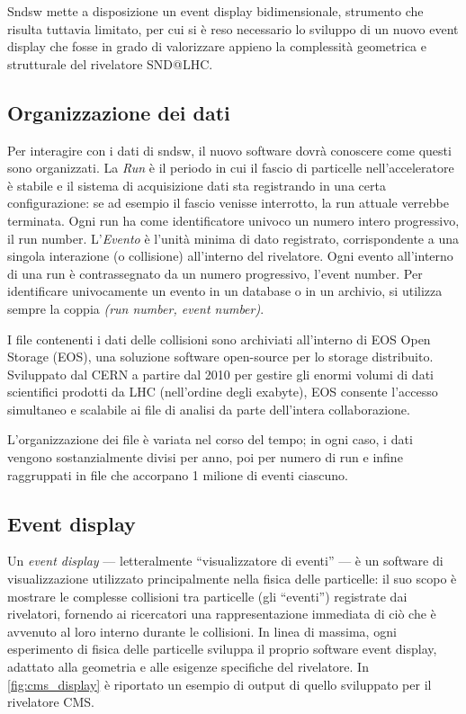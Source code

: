 Sndsw mette a disposizione un event display bidimensionale, strumento che risulta tuttavia limitato, per cui si è reso necessario lo sviluppo di un nuovo event display che fosse in grado di valorizzare appieno la complessità geometrica e strutturale del rivelatore SND@LHC.\@

\subsection{Organizzazione dei dati}
Per interagire con i dati di sndsw, il nuovo software dovrà conoscere come questi sono organizzati.
La \emph{Run} è il periodo in cui il fascio di particelle nell’acceleratore è stabile e il sistema di acquisizione dati sta registrando in una certa configurazione: se ad esempio il fascio venisse interrotto, la run attuale verrebbe terminata. Ogni run ha come identificatore univoco un numero intero progressivo, il run number.
L’\emph{Evento} è l’unità minima di dato registrato, corrispondente a una singola interazione (o collisione) all’interno del rivelatore. Ogni evento all’interno di una run è contrassegnato da un numero progressivo, l'event number.
Per identificare univocamente un evento in un database o in un archivio, si utilizza sempre la coppia \emph{(run number, event number)}.

I file contenenti i dati delle collisioni sono archiviati all'interno di EOS Open Storage (EOS), una soluzione software open-source per lo storage distribuito. Sviluppato dal CERN a partire dal 2010 per gestire gli enormi volumi di dati scientifici prodotti da LHC (nell'ordine degli exabyte), EOS consente l'accesso simultaneo e scalabile ai file di analisi da parte dell'intera collaborazione.

L'organizzazione dei file è variata nel corso del tempo; in ogni caso, i dati vengono sostanzialmente divisi per anno, poi per numero di run e infine raggruppati in file che accorpano 1 milione di eventi ciascuno.

\subsection{Event display}
Un \emph{event display} --- letteralmente “visualizzatore di eventi” --- è un software di visualizzazione utilizzato principalmente nella fisica delle particelle: il suo scopo è mostrare le complesse collisioni tra particelle (gli “eventi”) registrate dai rivelatori, fornendo ai ricercatori una rappresentazione immediata di ciò che è avvenuto al loro interno durante le collisioni.
In linea di massima, ogni esperimento di fisica delle particelle sviluppa il proprio software event display, adattato alla geometria e alle esigenze specifiche del rivelatore.
In \cref{fig:cms_display} è riportato un esempio di output di quello sviluppato per il rivelatore CMS.\@

